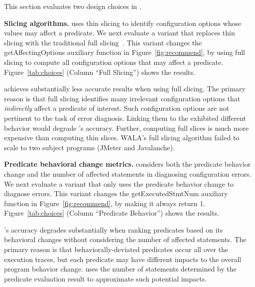 This section evaluates two design choices in \ourtool.

\vspace{1mm}

\noindent \textbf{{Slicing algorithms.}} \ourtool
uses thin slicing to identify configuration options
whose values may affect a predicate. We next evaluate
a variant that replaces thin slicing with
the traditional full slicing~\cite{Horwitz:1988}.
This variant changes the getAffectingOptions
auxiliary function in Figure~\ref{fig:recommend}, by using full slicing to compute all
configuration options that may affect a predicate.
Figure~\ref{tab:choices} (Column ``Full Slicing'') shows the results.


\ourtool achieves substantially less accurate results when
using full slicing. The primary reason is that full slicing
identifies many irrelevant configuration options that \textit{indirectly}
affect a predicate of interest. Such configuration options
are not pertinent to the task of error diagnosis. Linking them
to the exhibited different behavior would degrade
\ourtool's accuracy. Further, computing full slices is much
more expensive than computing thin slices. 
WALA's full slicing algorithm failed to scale
to two subject programs (JMeter and Javalanche).

\vspace{1mm}

\noindent \textbf{Predicate behavioral change metrics.}
\ourtool considers both the predicate behavior change
and the number of affected statements in diagnosing
configuration errors. We next evaluate a variant
that only uses the predicate behavior change to diagnose errors.
This variant 
changes the getExecutedStmtNum auxiliary function in
Figure~\ref{fig:recommend}, by making it always return 1.
Figure~\ref{tab:choices} (Column ``Predicate Behavior'') shows
the results. 



\ourtool's accuracy degrades substantially when ranking
predicates based on its behavioral changes without considering
the number of affected statements.
The primary reason is that behaviorally-deviated predicates occur all over the execution traces,
but each predicate
may have different impacts to the overall program behavior change.
\ourtool uses the number of statements determined by the predicate
evaluation result to approximate such potential impacts.


